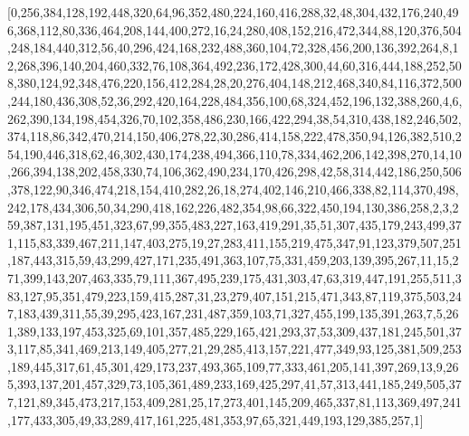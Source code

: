 [0,256,384,128,192,448,320,64,96,352,480,224,160,416,288,32,48,304,432,176,240,496,368,112,80,336,464,208,144,400,272,16,24,280,408,152,216,472,344,88,120,376,504,248,184,440,312,56,40,296,424,168,232,488,360,104,72,328,456,200,136,392,264,8,12,268,396,140,204,460,332,76,108,364,492,236,172,428,300,44,60,316,444,188,252,508,380,124,92,348,476,220,156,412,284,28,20,276,404,148,212,468,340,84,116,372,500,244,180,436,308,52,36,292,420,164,228,484,356,100,68,324,452,196,132,388,260,4,6,262,390,134,198,454,326,70,102,358,486,230,166,422,294,38,54,310,438,182,246,502,374,118,86,342,470,214,150,406,278,22,30,286,414,158,222,478,350,94,126,382,510,254,190,446,318,62,46,302,430,174,238,494,366,110,78,334,462,206,142,398,270,14,10,266,394,138,202,458,330,74,106,362,490,234,170,426,298,42,58,314,442,186,250,506,378,122,90,346,474,218,154,410,282,26,18,274,402,146,210,466,338,82,114,370,498,242,178,434,306,50,34,290,418,162,226,482,354,98,66,322,450,194,130,386,258,2,3,259,387,131,195,451,323,67,99,355,483,227,163,419,291,35,51,307,435,179,243,499,371,115,83,339,467,211,147,403,275,19,27,283,411,155,219,475,347,91,123,379,507,251,187,443,315,59,43,299,427,171,235,491,363,107,75,331,459,203,139,395,267,11,15,271,399,143,207,463,335,79,111,367,495,239,175,431,303,47,63,319,447,191,255,511,383,127,95,351,479,223,159,415,287,31,23,279,407,151,215,471,343,87,119,375,503,247,183,439,311,55,39,295,423,167,231,487,359,103,71,327,455,199,135,391,263,7,5,261,389,133,197,453,325,69,101,357,485,229,165,421,293,37,53,309,437,181,245,501,373,117,85,341,469,213,149,405,277,21,29,285,413,157,221,477,349,93,125,381,509,253,189,445,317,61,45,301,429,173,237,493,365,109,77,333,461,205,141,397,269,13,9,265,393,137,201,457,329,73,105,361,489,233,169,425,297,41,57,313,441,185,249,505,377,121,89,345,473,217,153,409,281,25,17,273,401,145,209,465,337,81,113,369,497,241,177,433,305,49,33,289,417,161,225,481,353,97,65,321,449,193,129,385,257,1]
